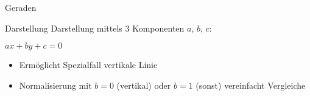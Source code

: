 \begin{frame}{Geraden}
	\begin{block}{Darstellung}
		Darstellung mittels 3 Komponenten $a$, $b$, $c$:
		\begin{center}
			$ax + by + c = 0$
		\end{center}
	\end{block}
	\begin{itemize}
		\item Ermöglicht Spezialfall vertikale Linie
		\item Normalisierung mit $b = 0$ (vertikal) oder $b = 1$ (sonst) vereinfacht Vergleiche
	\end{itemize}
\end{frame}


